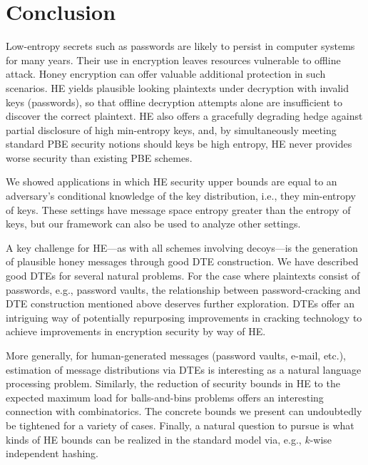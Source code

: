 \section{Conclusion}
\label{sec:conclusion}

Low-entropy secrets such as passwords are likely to persist in computer systems
for many years. Their use in encryption leaves resources vulnerable to offline
attack.  Honey encryption can offer valuable additional protection in such
scenarios. HE yields plausible looking plaintexts under decryption with
invalid keys (passwords), so that offline decryption attempts alone are
insufficient to discover the correct plaintext. 
HE also offers a gracefully degrading hedge against partial disclosure of
high min-entropy keys, and, by simultaneously meeting standard PBE security notions
should keys be high entropy, HE never provides worse security than existing PBE schemes.

We showed applications in which HE security upper bounds are 
equal to an adversary's conditional knowledge of the key
distribution, i.e., they min-entropy of keys. These settings have
message space entropy greater than the entropy of keys, but our framework
can also be used to analyze other settings.

A key challenge for HE---as with all schemes involving decoys---is the
generation of plausible honey messages through good DTE construction. We have
described good DTEs for several natural problems. For the case where plaintexts
consist of passwords, e.g., password vaults, the relationship between
password-cracking and DTE construction mentioned above deserves further
exploration. DTEs offer an intriguing way of potentially
repurposing improvements in cracking technology 
to achieve improvements in encryption security by way of HE.

More generally, for human-generated messages (password vaults, e-mail, etc.),
estimation of message distributions via DTEs is interesting as a natural
language processing problem. Similarly, the reduction of security bounds in HE
to the expected maximum load for balls-and-bins problems offers an interesting
connection with combinatorics. The concrete bounds we present can undoubtedly
be tightened for a variety of cases. Finally, a natural question to pursue is
what kinds of HE bounds can be realized in the standard model via, e.g., $k$-wise
independent hashing. 


